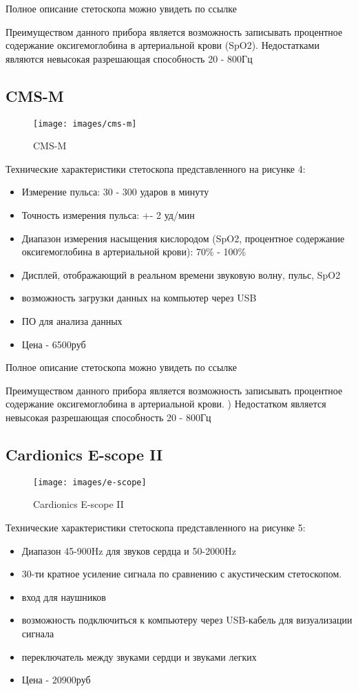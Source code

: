 \documentclass[../main.tex]{subfiles}
\begin{document}
Полное описание стетоскопа можно увидеть по ссылке \cite{cms-ve}

Преимуществом данного прибора является возможность записывать процентное содержание оксигемоглобина в артериальной крови (SpO2). Недостатками являются невысокая разрешающая способность 20 - 800Гц

\subsection{CMS-M}
\begin{figure}[H]
\centering
\texttt{[image: images/cms-m]}
\caption{CMS-M}
\end{figure}

Технические характеристики стетоскопа представленного на рисунке 4:
\begin{itemize}
  \item Измерение пульса: 30 - 300 ударов в минуту
  \item Точность измерения пульса: +- 2 уд/мин
  \item Диапазон измерения насыщения кислородом (SpO2, процентное содержание оксигемоглобина в артериальной крови): 70\% - 100\%
  \item Дисплей, отображающий в реальном времени звуковую волну, пульс, SpO2
  \item возможность загрузки данных на компьютер через USB
  \item ПО для анализа данных
  \item Цена - 6500руб
\end{itemize}

Полное описание стетоскопа можно увидеть по ссылке \cite{cms-m}

Преимуществом данного прибора является возможность записывать процентное содержание оксигемоглобина в артериальной крови. ) Недостатком является невысокая разрешающая способность 20 - 800Гц

\subsection{Cardionics E-scope II}
\begin{figure}[H]
\centering
\texttt{[image: images/e-scope]}
\caption{Cardionics E-scope II}
\end{figure}

Технические характеристики стетоскопа представленного на рисунке 5:
\begin{itemize}
  \item Диапазон 45-900Hz для звуков сердца и 50-2000Hz
  \item 30-ти кратное усиление сигнала по сравнению с акустическим стетоскопом.
  \item вход для наушников
  \item возможность подключиться к компьютеру через USB-кабель для визуализации сигнала
  \item переключатель между звуками сердци и звуками легких
  \item Цена - 20900руб
\end{itemize}
\end{document}

